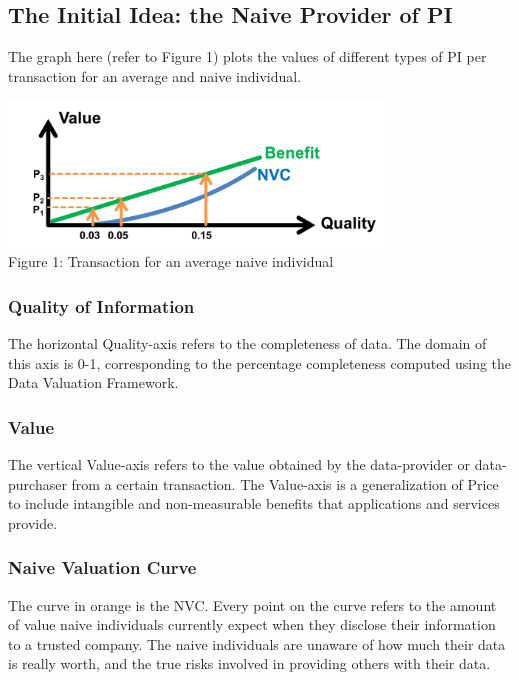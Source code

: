 \documentclass{icmmcm}
\begin{document}
\subsection{The Initial Idea: the Naive Provider of PI}
The graph here (refer to Figure 1) plots the values of different types of PI per transaction for an average and naive individual.

\includegraphics[width=0.75\textwidth]{Picture1.png}
\\ \caption{Figure 1: Transaction for an average naive individual}

\subsubsection*{Quality of Information} 
The horizontal Quality-axis refers to the completeness of data. The domain of this axis is 0-1, corresponding to the percentage completeness computed using the Data Valuation Framework.

\subsubsection*{Value} 
The vertical Value-axis refers to the value obtained by the data-provider or data-purchaser from a certain transaction. The Value-axis is a generalization of Price to include intangible and non-measurable benefits that applications and services provide. 

\subsubsection*{Naive Valuation Curve} 
The curve in orange is the NVC. Every point on the curve refers to the amount of value naive individuals currently expect when they disclose their information to a trusted company. The naive individuals are unaware of how much their data is really worth, and the true risks involved in providing others with their data.
\end{document}
